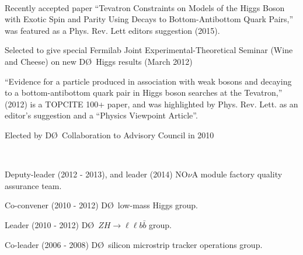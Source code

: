 \documentclass[amsmath,amssymb]{revtex4}
\def\dzero{D\O}
\begin{document}
\\
\begin{list}{}
            {\setlength{\itemsep}{0.0in}\setlength{\parsep}{0.0in}
             \addtolength{\parskip}{-0.5in}}
\item Recently accepted paper ``Tevatron Constraints  on Models of the Higgs Boson with Exotic Spin and Parity
      Using Decays  to Bottom-Antibottom Quark Pairs,'' was featured as a  Phys. Rev. Lett editors suggestion (2015).
\item Selected to give special Fermilab Joint Experimental-Theoretical Seminar (Wine and Cheese)
      on new \dzero~Higgs results (March 2012)
\item  ``Evidence for a particle produced in association with weak bosons and decaying to a
        bottom-antibottom quark pair in Higgs boson searches at the Tevatron,'' (2012) is a TOPCITE 100+ paper, and
        was highlighted by Phys. Rev. Lett. as an editor's suggestion and a ``Physics Viewpoint Article''.
\item Elected by \dzero~Collaboration to Advisory Council in 2010
\end{list}
\vspace{\baselineskip}

\\
\begin{list}{}
            {\setlength{\itemsep}{0.0in}\setlength{\parsep}{0.0in}
             \addtolength{\parskip}{-0.5in}}
\item Deputy-leader (2012 - 2013), and leader (2014) NO$\nu$A module factory quality assurance team.
\item Co-convener (2010 - 2012) \dzero~low-mass Higgs group.
\item Leader (2010 - 2012) \dzero~$ZH\to\ell\ell b\bar{b}$ group.
\item Co-leader (2006 - 2008) \dzero~silicon microstrip tracker operations group.
\end{list}
\vspace{\baselineskip}
\end{document}
